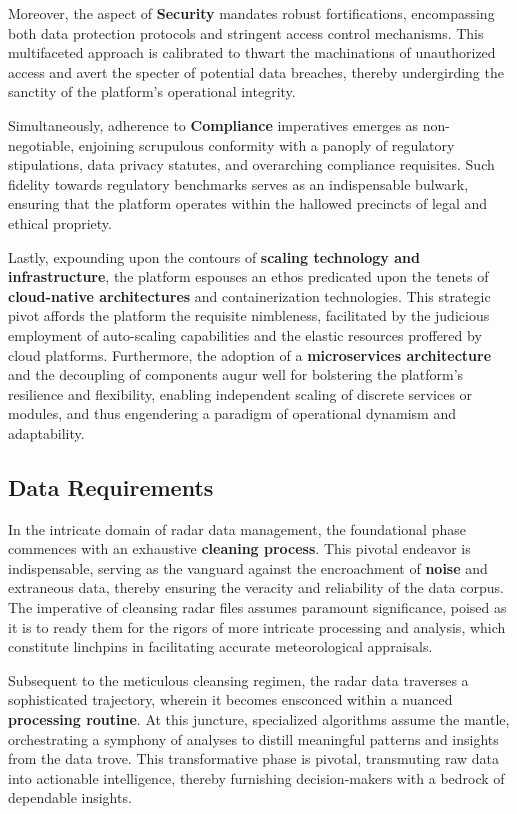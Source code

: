 Moreover, the aspect of \textbf{Security} mandates robust fortifications,
encompassing both data protection protocols and stringent access control
mechanisms. This multifaceted approach is calibrated to thwart the machinations
of unauthorized access and avert the specter of potential data breaches, thereby
undergirding the sanctity of the platform's operational integrity.

Simultaneously, adherence to \textbf{Compliance} imperatives emerges as
non-negotiable, enjoining scrupulous conformity with a panoply of regulatory
stipulations, data privacy statutes, and overarching compliance requisites. Such
fidelity towards regulatory benchmarks serves as an indispensable bulwark,
ensuring that the platform operates within the hallowed precincts of legal and
ethical propriety.

Lastly, expounding upon the contours of \textbf{scaling technology and
    infrastructure}, the platform espouses an ethos predicated upon the tenets of
\textbf{cloud-native architectures} and containerization technologies. This
strategic pivot affords the platform the requisite nimbleness, facilitated by
the judicious employment of auto-scaling capabilities and the elastic resources
proffered by cloud platforms. Furthermore, the adoption of a
\textbf{microservices architecture} and the decoupling of components augur well
for bolstering the platform's resilience and flexibility, enabling independent
scaling of discrete services or modules, and thus engendering a paradigm of
operational dynamism and adaptability.

\subsection{Data Requirements}
In the intricate domain of radar data management, the foundational phase
commences with an exhaustive \textbf{cleaning process}. This pivotal endeavor is
indispensable, serving as the vanguard against the encroachment of
\textbf{noise} and extraneous data, thereby ensuring the veracity and
reliability of the data corpus. The imperative of cleansing radar files assumes
paramount significance, poised as it is to ready them for the rigors of more
intricate processing and analysis, which constitute linchpins in facilitating
accurate meteorological appraisals.

Subsequent to the meticulous cleansing regimen, the radar data traverses a
sophisticated trajectory, wherein it becomes ensconced within a nuanced
\textbf{processing routine}. At this juncture, specialized algorithms assume the
mantle, orchestrating a symphony of analyses to distill meaningful patterns and
insights from the data trove. This transformative phase is pivotal, transmuting
raw data into actionable intelligence, thereby furnishing decision-makers with a
bedrock of dependable insights.

